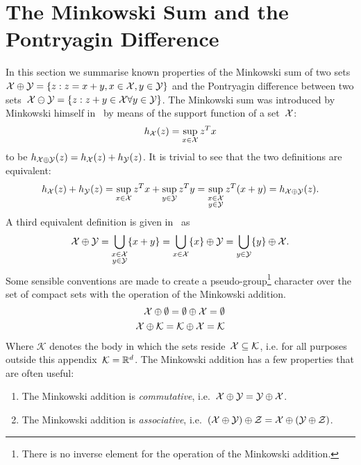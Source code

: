 \resetcounters
\chapter{The Minkowski Sum and the Pontryagin Difference}\label{app:minkowski:pontryagin:identities}
%
%
%
%
%
\mysplit In this section we summarise known properties of the Minkowski sum of two sets~$\mathcal X\oplus\mathcal Y=\{z:z=x+y,x\in\mathcal X,y\in\mathcal Y\}$ and the Pontryagin difference between two sets~$\mathcal X\ominus\mathcal Y=\{z:z+y\in\mathcal X\forall y\in\mathcal Y\}$.
%
The Minkowski sum was introduced by Minkowski himself in~\cite{Minkowski:1903} by means of the support function of a set~$\mathcal X$:
%
\begin{equation}
	h_\mathcal X(z) = \sup_{x\in\mathcal X}z^Tx
\end{equation}
%
to be $h_{\mathcal X\oplus\mathcal Y}(z) = h_\mathcal X(z)+h_\mathcal Y(z)$.
%
It is trivial to see that the two definitions are equivalent:
%
\begin{equation}
	h_\mathcal X(z)+h_\mathcal Y(z) = \sup_{x\in\mathcal X}z^Tx+\sup_{y\in\mathcal Y}z^Ty = \sup_{\substack{x\in\mathcal X\\ y\in\mathcal Y}}z^T(x+y) = h_{\mathcal X\oplus\mathcal Y}(z).
\end{equation}
%
A third equivalent definition is given in~\cite{Hadwiger:1957} as
%
\begin{equation}
	\mathcal X\oplus\mathcal Y = \bigcup_{\substack{x\in\mathcal X\\y\in\mathcal Y}}\{x+y\} = \bigcup_{x\in\mathcal X}\{x\}\oplus\mathcal Y = \bigcup_{y\in\mathcal Y}\{y\}\oplus\mathcal X.
\end{equation}
%
Some sensible conventions are made to create a pseudo-group\footnote{There is no inverse element for the operation of the Minkowski addition.} character over the set of compact sets with the operation of the Minkowski addition.
%
\begin{align}
\mathcal X\oplus\emptyset = \emptyset\oplus\mathcal X=\emptyset\\
\mathcal X\oplus\mathcal K = \mathcal K\oplus\mathcal X=\mathcal K
\end{align}
%
Where $\mathcal K$ denotes the body in which the sets reside~$\mathcal X\subseteq\mathcal K$, i.e. for all purposes outside this appendix~$\mathcal K=\mathbb R^d$.
%
The Minkowski addition has a few properties that are often useful:
%
\begin{enumerate}
\item The Minkowski addition is \emph{commutative}, i.e.~$\mathcal X\oplus\mathcal Y = \mathcal Y\oplus\mathcal X$.
\item The Minkowski addition is \emph{associative}, i.e.~$(\mathcal X\oplus\mathcal Y)\oplus\mathcal Z=\mathcal X\oplus(\mathcal Y\oplus\mathcal Z)$.
\end{enumerate}
